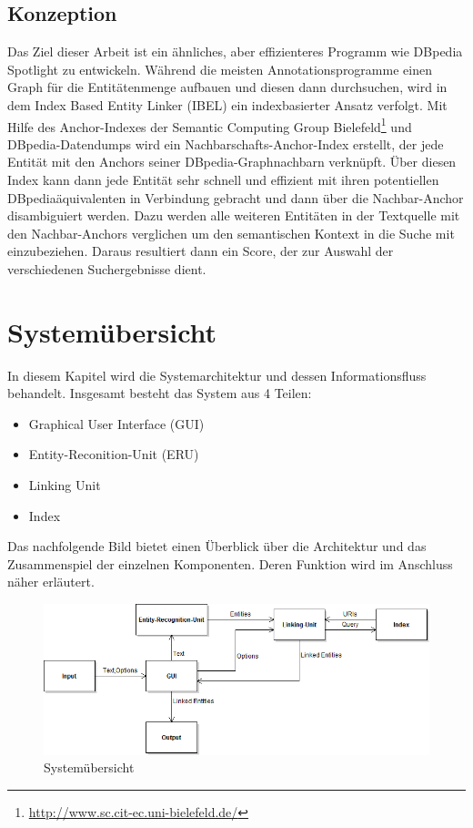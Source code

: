 \documentclass[11pt, a4paper, oneside]{Thesis} %
\begin{document}
\section{Konzeption}
Das Ziel dieser Arbeit ist ein \"ahnliches, aber effizienteres Programm wie DBpedia Spotlight zu entwickeln. W\"ahrend die meisten Annotationsprogramme einen Graph f\"ur die Entit\"atenmenge aufbauen und diesen dann durchsuchen, wird in dem Index Based Entity Linker (IBEL) ein indexbasierter Ansatz verfolgt. Mit Hilfe des Anchor-Indexes der Semantic Computing Group Bielefeld\footnote{\url{http://www.sc.cit-ec.uni-bielefeld.de/}} und DBpedia-Datendumps wird ein Nachbarschafts-Anchor-Index erstellt, der jede Entit\"at mit den Anchors seiner DBpedia-Graphnachbarn verkn\"upft. \"Uber diesen Index kann dann jede Entit\"at sehr schnell und effizient mit ihren potentiellen DBpedia\"aquivalenten in Verbindung gebracht und dann \"uber die Nachbar-Anchor disambiguiert werden. Dazu werden alle weiteren Entit\"aten in der Textquelle mit den Nachbar-Anchors verglichen um den semantischen Kontext in die Suche mit einzubeziehen. Daraus resultiert dann ein Score, der zur Auswahl der verschiedenen Suchergebnisse dient.

\chapter{System\"ubersicht}
\label{Kapitel 2}

In diesem Kapitel wird die Systemarchitektur und dessen Informationsfluss behandelt. Insgesamt besteht das System aus 4 Teilen:
\begin{itemize}
\item Graphical User Interface (GUI)
\item Entity-Reconition-Unit (ERU)
\item Linking Unit
\item Index
\end{itemize}
Das nachfolgende Bild bietet einen \"Uberblick \"uber die Architektur und das Zusammenspiel der einzelnen Komponenten. Deren Funktion wird im Anschluss n\"aher erl\"autert.
\begin{figure}[ht]
\centering
\includegraphics[scale=0.55]{./system.png}
\caption[System\"ubersicht]{System\"ubersicht}
\end{figure}
\end{document}

